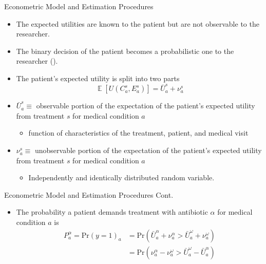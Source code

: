 \documentclass{beamer}
\DeclareMathOperator{\EX}{\mathbb{E}}
\begin{document}
\begin{frame}{Econometric Model and Estimation Procedures}
\begin{itemize}
\item The expected utilities are known to the patient but are not observable to the researcher.
\item The binary decision of the patient becomes a probabilistic one to the researcher (\cite{train_discrete_nodate}).
\item The patient's expected utility is split into two parts
\begin{equation}
  \EX[U(C_a^s,E_a^s)] = \bar{U}_a^s + \nu_a^s
\end{equation}
\item $\bar{U}_a^s \equiv$ observable portion of the expectation of the patient's expected utility from treatment $s$ for medical condition $a$
\begin{itemize}
  \item function of characteristics of the treatment, patient, and medical visit
\end{itemize}
\item $\nu_a^s \equiv$ unobservable portion of the expectation of the patient's expected utility from treatment $s$ for medical condition $a$
\begin{itemize}
  \item Independently and identically distributed random variable.
\end{itemize}
\end{itemize}
\end{frame}

\begin{frame}{Econometric Model and Estimation Procedures Cont.}
\begin{itemize}
\item The probability a patient demands treatment with antibiotic $\alpha$ for medical condition $a$ is
  \begin{equation}
  \begin{split}
      P_a^\alpha =\text{Pr}(y = 1)_a & = \text{Pr}(\bar{U}_a^\alpha + \nu_a^\alpha > \bar{U}_a^\omega + \nu_a^\omega)\\
      & = \text{Pr}(\nu_a^\alpha - \nu_a^\omega > \bar{U}_a^\omega - \bar{U}_a^\alpha)\\
  \end{split}
  \end{equation}
\end{itemize}
\end{frame}
\end{document}
